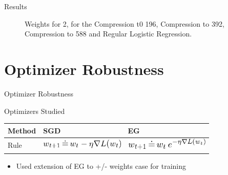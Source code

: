 \documentclass{beamer}
\begin{document}
	\begin{frame}{Results}
		\begin{figure}[h!]
			\centering
			\caption{\enspace Weights for 2, for the Compression t0 196, Compression to 392, Compression to 588 and Regular Logistic Regression.}
		\end{figure}
	\end{frame}
	
	\section*{Optimizer Robustness}
	
	\begin{frame}{Optimizer Robustness}
		\begin{block}{Optimizers Studied}
			\begin{center}
				\begin{tabular}{ l | l | l }
					Method & SGD & EG \\ \hline
					Rule & \includegraphics[width=4cm]{sgd_rule} & \includegraphics[width=4cm]{eg_rule}
				\end{tabular}
			\end{center}
		\end{block}
		\begin{itemize}
			\item Used extension of EG to +/- weights case for training
		\end{itemize}
	\end{frame}
	
\end{document}
